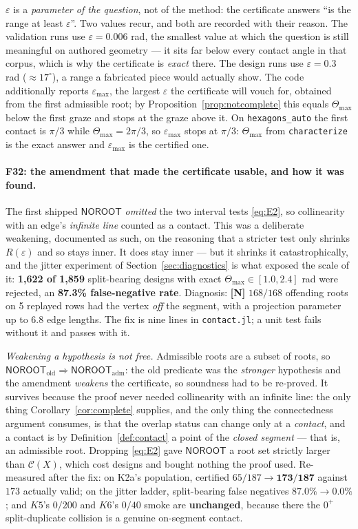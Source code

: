 \documentclass[11pt,a4paper]{article}
\theoremstyle{definition}
\newcommand{\Tmax}{\Theta_{\max}}
\newcommand{\file}[1]{\texttt{\small #1}}
\newcommand{\NOROOT}{\textsf{NOROOT}}
\begin{document}
$\varepsilon$ is a \emph{parameter of the question}, not of the method: the certificate
answers ``is the range at least $\varepsilon$''. Two values recur, and both are recorded with
their reason. The validation runs use $\varepsilon=0.006$ rad, the smallest value at which the
question is still meaningful on authored geometry --- it sits far below every contact angle in
that corpus, which is why the certificate is \emph{exact} there. The design runs use
$\varepsilon=0.3$ rad ($\approx17^\circ$), a range a fabricated piece would actually show.
The code additionally reports $\varepsilon_{\max}$, the largest $\varepsilon$ the certificate
will vouch for, obtained from the first admissible root; by
Proposition~\ref{prop:notcomplete} this equals $\Tmax$ below the first graze and stops at the
graze above it. On \file{hexagons\_auto} the first contact is $\pi/3$ while $\Tmax=2\pi/3$, so
$\varepsilon_{\max}$ stops at $\pi/3$: $\Tmax$ from \file{characterize} is the exact answer
and $\varepsilon_{\max}$ is the certified one.

\paragraph{F32: the amendment that made the certificate usable, and how it was found.} The
first shipped $\NOROOT$ \emph{omitted} the two interval tests \eqref{eq:E2}, so collinearity
with an edge's \emph{infinite line} counted as a contact. This was a deliberate weakening,
documented as such, on the reasoning that a stricter test only shrinks $R(\varepsilon)$ and so
stays inner. It does stay inner --- but it shrinks it catastrophically, and the jitter
experiment of Section~\ref{sec:diagnostics} is what exposed the scale of it:
\textbf{1{,}622 of 1{,}859} split-bearing designs with exact $\Tmax\in[1.0,2.4]$ rad were
rejected, an \textbf{87.3\% false-negative rate}. Diagnosis:
\textbf{[N]} $168/168$ offending roots on 5 replayed rows had the vertex \emph{off} the
segment, with a projection parameter up to 6.8 edge lengths. The fix is nine lines in
\file{contact.jl}; a unit test fails without it and passes with it.

\emph{Weakening a hypothesis is not free.} Admissible roots are a subset of roots, so
$\NOROOT_{\mathrm{old}}\Rightarrow\NOROOT_{\mathrm{adm}}$: the old predicate was the
\emph{stronger} hypothesis and the amendment \emph{weakens} the certificate, so soundness had
to be re-proved. It survives because the proof never needed collinearity with an infinite
line: the only thing Corollary~\ref{cor:complete} supplies, and the only thing the
connectedness argument consumes, is that the overlap status can change only at a
\emph{contact}, and a contact is by Definition~\ref{def:contact} a point of the \emph{closed
segment} --- that is, an admissible root. Dropping \eqref{eq:E2} gave $\NOROOT$ a root set
strictly larger than $\mathcal{C}(X)$, which cost designs and bought nothing the proof used.
Re-measured after the fix: on K2a's population, certified $65/187\to\mathbf{173/187}$ against
$173$ actually valid; on the jitter ladder, split-bearing false negatives
$87.0\%\to\mathbf{0.0\%}$; and $K5$'s $0/200$ and $K6$'s $0/40$ smoke are
\textbf{unchanged}, because there the $0^+$ split-duplicate collision is a genuine on-segment
contact.
\end{document}
